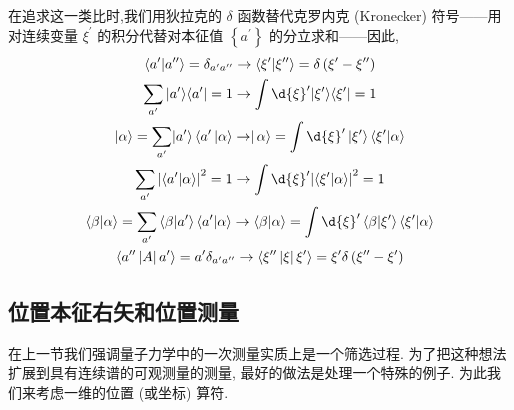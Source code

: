 \documentclass[lang=cn,newtx,10pt,scheme=chinese,thmcnt=section]{elegantbook}
\begin{document}
在追求这一类比时,我们用狄拉克的 $\delta$ 函数替代克罗内克 (Kronecker) 符号——用对连续变量 ${\xi }^{\prime }$ 的积分代替对本征值 $\left\{ {a}^{\prime }\right\}$ 的分立求和——因此,
\begin{equation}
	\begin{gathered}
		\left\langle {{a}^{\prime } | {a}^{\prime \prime }}\right\rangle = {\delta }_{{a}^{\prime }{a}^{\prime \prime }}\rightarrow \left\langle {{\xi }^{\prime } | {\xi }^{\prime \prime }}\right\rangle = \delta \left( {{\xi }^{\prime } - {\xi }^{\prime \prime }}\right)\\
		\mathop{\sum }\limits_{{a}^{\prime }}| {a}^{\prime }\rangle \langle {{a}^{\prime } | = 1\rightarrow \int \d{\xi }^{\prime } | {\xi }^{\prime }}\rangle \langle {\xi }^{\prime }| = 1\\
		| {\alpha \rangle = \mathop{\sum }\limits_{{a}^{\prime }}}| {a}^{\prime }\rangle \left\langle {{a}^{\prime }\left| {\alpha \rangle\rightarrow }\right| \alpha }\right\rangle = \int \d{\xi }^{\prime }\left| {\xi }^{\prime }\right\rangle \left\langle {{\xi }^{\prime } | \alpha }\right\rangle\\
		\mathop{\sum }\limits_{{a}^{\prime }}{\left| \left\langle {a}^{\prime } | \alpha \right\rangle \right| }^{2} = 1\rightarrow \int \d{\xi }^{\prime }{\left| \left\langle {\xi }^{\prime } | \alpha \right\rangle \right| }^{2} = 1\\
		\langle \beta | \alpha \rangle = \mathop{\sum }\limits_{{a}^{\prime }}\left\langle {\beta | {a}^{\prime }}\right\rangle \left\langle {{a}^{\prime } | \alpha }\right\rangle \rightarrow \langle \beta | \alpha \rangle = \int \d{\xi }^{\prime }\left\langle {\beta | {\xi }^{\prime }}\right\rangle \left\langle {{\xi }^{\prime } | \alpha }\right\rangle\\
		\left\langle {{a}^{\prime \prime }\left| A\right| {a}^{\prime }}\right\rangle = {a}^{\prime }{\delta }_{{a}^{\prime }{a}^{\prime \prime }} \rightarrow \left\langle {{\xi }^{\prime \prime }\left| \xi \right| {\xi }^{\prime }}\right\rangle = {\xi }^{\prime }\delta \left( {{\xi }^{\prime \prime } - {\xi }^{\prime }}\right)\\
	\end{gathered}
\end{equation}
\subsection*{位置本征右矢和位置测量}
在上一节我们强调量子力学中的一次测量实质上是一个筛选过程. 为了把这种想法扩展到具有连续谱的可观测量的测量, 最好的做法是处理一个特殊的例子. 为此我们来考虑一维的位置 (或坐标) 算符.
\end{document}
